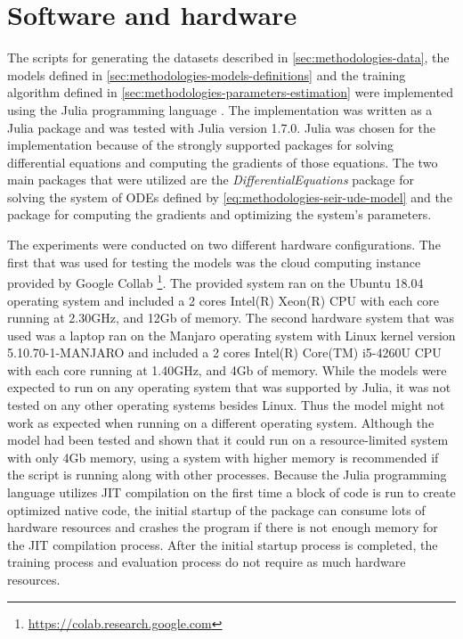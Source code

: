 \section{Software and hardware}

The scripts for generating the datasets described in \autoref{sec:methodologies-data}, the models defined in \autoref{sec:methodologies-models-definitions} and the training algorithm defined in \autoref{sec:methodologies-parameters-estimation} were implemented using the Julia programming language \cite{bezanson2012julia}.
The implementation was written as a Julia package and was tested with Julia version 1.7.0.
Julia was chosen for the implementation because of the strongly supported packages for solving differential equations and computing the gradients of those equations.
The two main packages that were utilized are the \textit{DifferentialEquations} package \cite{rackauckas2017differentialequations} for solving the system of \glspl{ODE} defined by \autoref{eq:methodologies-seir-ude-model} and the  \cite{rackauckasUniversalDifferentialEquations2020} package for computing the gradients and optimizing the system's parameters.

The experiments were conducted on two different hardware configurations.
The first that was used for testing the models was the cloud computing instance provided by Google Collab \footnote{\url{https://colab.research.google.com}}.
The provided system ran on the Ubuntu 18.04 operating system and included a 2 cores Intel(R) Xeon(R) CPU with each core running at 2.30GHz, and 12Gb of memory.
The second hardware system that was used was a laptop ran on the Manjaro operating system with Linux kernel version 5.10.70-1-MANJARO and included a 2 cores Intel(R) Core(TM) i5-4260U CPU with each core running at 1.40GHz, and 4Gb of memory.
While the models were expected to run on any operating system that was supported by Julia, it was not tested on any other operating systems besides Linux.
Thus the model might not work as expected when running on a different operating system.
Although the model had been tested and shown that it could run on a resource-limited system with only 4Gb memory, using a system with higher memory is recommended if the script is running along with other processes.
Because the Julia programming language utilizes \gls{JIT} compilation on the first time a block of code is run to create optimized native code, the initial startup of the package can consume lots of hardware resources and crashes the program if there is not enough memory for the \gls{JIT} compilation process.
After the initial startup process is completed, the training process and evaluation process do not require as much hardware resources.